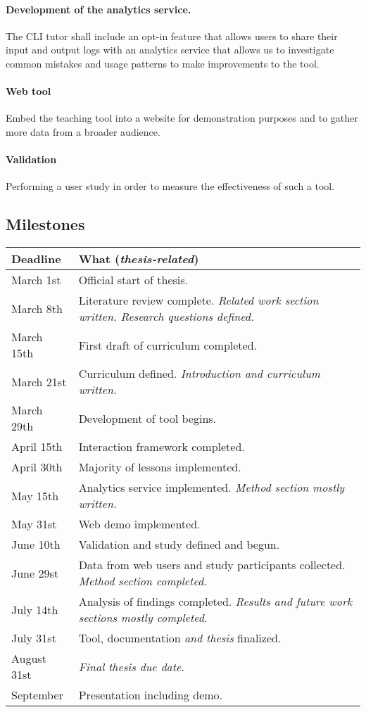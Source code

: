 \documentclass{task_description}
\begin{document}
\paragraph{Development of the analytics service.} The CLI tutor shall include
an opt-in feature that allows users to share their input and output logs with
an analytics service that allows us to investigate common mistakes and usage
patterns to make improvements to the tool.

\paragraph{Web tool} Embed the teaching tool into a website for demonstration
purposes and to gather more data from a broader audience.

\paragraph{Validation} Performing a user study in order to measure the
effectiveness of such a tool.

\subsection*{Milestones}

\begin{tabular}{lp{10cm}}
Deadline & What (\emph{thesis-related}) \\
\hline\noalign{\smallskip}
March 1st & Official start of thesis. \\
March 8th  & Literature review complete. \emph{Related work section written. Research questions defined.} \\
March 15th & First draft of curriculum completed. \\
March 21st & Curriculum defined. \emph{Introduction and curriculum written.} \\
March 29th & Development of tool begins. \\
April 15th & Interaction framework completed. \\
April 30th & Majority of lessons implemented. \\
May 15th & Analytics service implemented. \emph{Method section mostly written.} \\
May 31st & Web demo implemented. \\
June 10th & Validation and study defined and begun. \\
June 29st & Data from web users and study participants collected. \emph{Method section completed}. \\
July 14th & Analysis of findings completed. \emph{Results and future work sections mostly completed}. \\
July 31st & Tool, documentation \emph{and thesis} finalized. \\
August 31st & \emph{Final thesis due date}. \\
September & Presentation including demo.
\end{tabular}
\end{document}
